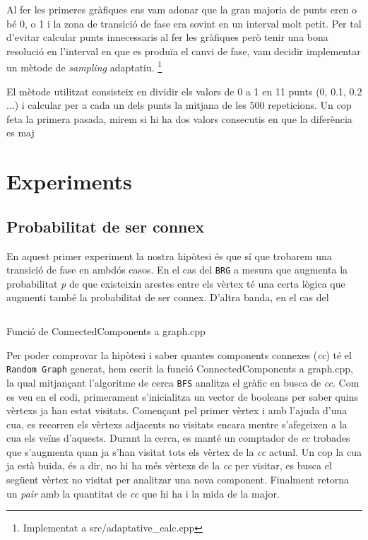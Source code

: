 Al fer les primeres gràfiques ens vam adonar que la gran majoria de punts eren o bé 0, o 1 i la zona de transició de fase
era sovint en un interval molt petit. Per tal d'evitar calcular punts innecessaris al fer les gràfiques però tenir una
bona resolució en l'interval en que es produïa el canvi de fase, vam decidir implementar un mètode de \emph{sampling}
adaptatiu. \footnote{Implementat a src/adaptative_calc.cpp}

El mètode utilitzat consisteix en dividir els valors de 0 a 1 en 11 punts (0, 0.1, 0.2 ...) i calcular per a cada un dels
punts la mitjana de les 500 repeticions. Un cop feta la primera pasada, mirem si hi ha dos valors consecutis en que la
diferència es maj

\section{Experiments}
\subsection{Probabilitat de ser connex}
En aquest primer experiment la nostra hipòtesi és que sí que trobarem una transició de fase en ambdós casos. En el cas del \texttt{BRG} a mesura que augmenta la probabilitat \emph{p} de que existeixin arestes entre els vèrtex té una certa lògica que augmenti també la probabilitat de ser connex. D'altra banda, en el cas del 


\begin{listing}
\inputminted[firstline=83,lastline=122]{cpp}{src/graph.cpp}
\caption{Funció de ConnectedComponents a graph.cpp}
\end{listing}

Per poder comprovar la hipòtesi i saber quantes components connexes (\textit{cc}) té el \texttt{Random Graph} generat, hem escrit la funció ConnectedComponents a graph.cpp, la qual mitjançant l'algoritme de cerca \texttt{BFS} analitza el gràfic en busca de \textit{cc}. Com es veu en el codi, primerament s'inicialitza un vector de booleans per saber quins vèrtexs ja han estat visitats. Començant pel primer vèrtex i amb l'ajuda d'una cua, es recorren els vèrtexs adjacents no visitats encara mentre s'afegeixen a la cua els veïns d'aquests. Durant la cerca, es manté un comptador de \textit{cc} trobades que s'augmenta quan ja s'han visitat tots els vèrtex de la \textit{cc} actual. Un cop la cua ja està buida, és a dir, no hi ha més vèrtexs de la \textit{cc} per visitar, es busca el següent vèrtex no visitat per analitzar una nova component. Finalment retorna un \textit{pair} amb la quantitat de \textit{cc} que hi ha i la mida de la major.


